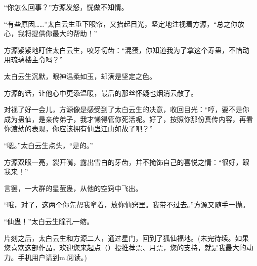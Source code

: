 \begin{this_body}
“你怎么回事？”方源发怒，恍做不知情。

“有些原因……”太白云生垂下眼帘，又抬起目光，坚定地注视着方源，“总之你放心，我将提供你最大的帮助！”

方源紧紧地盯住太白云生，咬牙切齿：“混蛋，你知道我为了拿这个寿蛊，不惜动用琉璃楼主令吗？”

太白云生沉默，眼神温柔如玉，却满是坚定之色。

方源的话，让他心中更添温暖，最后的那丝怀疑也烟消云散了。

对视了好一会儿，方源像是感受到了太白云生的决意，收回目光：“哼，要不是你成为蛊仙，是亲传弟子，我才懒得管你死活呢。好了，按照你那份真传内容，再看你渡劫的表现，你应该拥有仙蛊江山如故了吧？”

“嗯。”太白云生点头，“是的。”

方源双眼一亮，裂开嘴，露出雪白的牙齿，并不掩饰自己的喜悦之情：“很好，跟我来！”

言罢，一大群的星萤蛊，从他的空窍中飞出。

“哦，对了，这两个你先帮我拿着，放你仙窍里。我带不过去。”方源又随手一抛。

“仙蛊！”太白云生瞳孔一缩。

片刻之后，太白云生和方源二人，通过星门，回到了狐仙福地。(未完待续。如果您喜欢这部作品，欢迎您来起点（）投推荐票、月票，您的支持，就是我最大的动力。手机用户请到m.阅读。)

\end{this_body}

